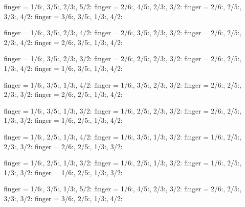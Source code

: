\documentclass[../main.tex]{subfiles}
\begin{document}

{finger = {1/6:\R, 3/5:, 2/3:, 5/2:}}
{finger = {2/6:, 4/5:, 2/3:, 3/2:\R}}
{finger = {2/6:, 2/5:\R, 3/3:, 4/2:}}
{finger = {3/6:, 3/5:, 1/3:\R, 4/2:}}

{finger = {1/6:\R, 3/5:, 2/3:, 4/2:}}
{finger = {2/6:, 3/5:, 2/3:, 3/2:\R}}
{finger = {2/6:, 2/5:\R, 2/3:, 4/2:}}
{finger = {2/6:, 3/5:, 1/3:\R, 4/2:}}

{finger = {1/6:\R, 3/5:, 2/3:, 3/2:}}
{finger = {2/6:, 2/5:, 2/3:, 3/2:\R}}
{finger = {2/6:, 2/5:\R, 1/3:, 4/2:}}
{finger = {1/6:, 3/5:, 1/3:\R, 4/2:}}

{finger = {1/6:\R, 3/5:, 1/3:, 4/2:}}
{finger = {1/6:, 3/5:, 2/3:, 3/2:\R}}
{finger = {2/6:, 2/5:\R, 2/3:, 3/2:}}
{finger = {2/6:, 2/5:, 1/3:\R, 4/2:}}


{finger = {1/6:\R, 3/5:, 1/3:, 3/2:}}
{finger = {1/6:, 2/5:, 2/3:, 3/2:\R}}
{finger = {2/6:, 2/5:\R, 1/3:, 3/2:}}
{finger = {1/6:, 2/5:, 1/3:\R, 4/2:}}

{finger = {1/6:\R, 2/5:, 1/3:, 4/2:}}
{finger = {1/6:, 3/5:, 1/3:, 3/2:\R}}
{finger = {1/6:, 2/5:\R, 2/3:, 3/2:}}
{finger = {2/6:, 2/5:, 1/3:\R, 3/2:}}


{finger = {1/6:\R, 2/5:, 1/3:, 3/2:}}
{finger = {1/6:, 2/5:, 1/3:, 3/2:\R}}
{finger = {1/6:, 2/5:\R, 1/3:, 3/2:}}
{finger = {1/6:, 2/5:, 1/3:\R, 3/2:}}

{finger = {1/6:\R, 3/5:, 1/3:, 5/2:}}
{finger = {1/6:, 4/5:, 2/3:, 3/2:\R}}
{finger = {2/6:, 2/5:\R, 3/3:, 3/2:}}
{finger = {3/6:, 2/5:, 1/3:\R, 4/2:}}
\end{document}
